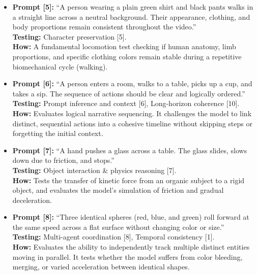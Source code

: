 \documentclass[sigconf]{acmart}
\begin{document}
\begin{itemize}
    \item \textbf{Prompt [5]:} ``A person wearing a plain green shirt and black pants walks in a straight line across a neutral background. Their appearance, clothing, and body proportions remain consistent throughout the video.''
          \\ \textbf{Testing:} Character preservation [5].
          \\ \textbf{How:} A fundamental locomotion test checking if human anatomy, limb proportions, and specific clothing colors remain stable during a repetitive biomechanical cycle (walking).


    \item \textbf{Prompt [6]:} ``A person enters a room, walks to a table, picks up a cup, and takes a sip. The sequence of actions should be clear and logically ordered.''
          \\ \textbf{Testing:} Prompt inference and context [6], Long-horizon coherence [10].
          \\ \textbf{How:} Evaluates logical narrative sequencing. It challenges the model to link distinct, sequential actions into a cohesive timeline without skipping steps or forgetting the initial context.



    \item \textbf{Prompt [7]:} ``A hand pushes a glass across a table. The glass slides, slows down due to friction, and stops.''
          \\ \textbf{Testing:} Object interaction \& physics reasoning [7].
          \\ \textbf{How:} Tests the transfer of kinetic force from an organic subject to a rigid object, and evaluates the model's simulation of friction and gradual deceleration.

    \item \textbf{Prompt [8]:} ``Three identical spheres (red, blue, and green) roll forward at the same speed across a flat surface without changing color or size.''
          \\ \textbf{Testing:} Multi-agent coordination [8], Temporal consistency [1].
          \\ \textbf{How:} Evaluates the ability to independently track multiple distinct entities moving in parallel. It tests whether the model suffers from color bleeding, merging, or varied acceleration between identical shapes.


\end{itemize}
\end{document}
